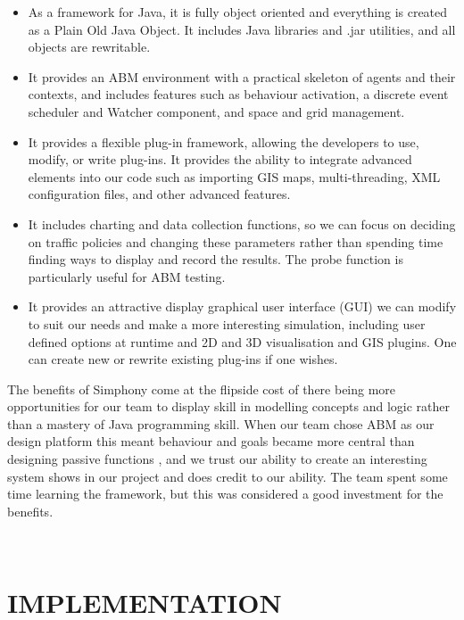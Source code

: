\documentclass[11pt]{article}
\begin{document}
\begin{itemize}\itemsep0pt
\item As a framework for Java, it is fully object oriented and everything is created as a Plain Old Java Object. It includes Java libraries and .jar utilities, and all objects are rewritable.
\\
\item It provides an ABM environment with a practical skeleton of agents and their contexts, and includes features such as behaviour activation, a discrete event scheduler and Watcher component, and space and grid management.
\\
\item It provides a flexible plug-in framework, allowing the developers to use, modify, or write plug-ins. It provides the ability to integrate advanced elements into our code such as importing GIS maps, multi-threading, XML configuration files, and other advanced features.
\\
\item It includes charting and data collection functions, so we can focus on deciding on traffic policies and changing these parameters rather than spending time finding ways to display and record the results. The probe function is particularly useful for ABM testing.
\\
\item It provides an attractive display graphical user interface (GUI) we can modify to suit our needs and make a more interesting simulation, including user defined options at runtime and 2D and 3D visualisation and GIS plugins. One can create new or rewrite existing plug-ins if one wishes.
\end {itemize}

The benefits of Simphony come at the flipside cost of there being more opportunities for our team to display skill in modelling concepts and logic rather than a mastery of Java programming skill. When our team chose ABM as our design platform this meant behaviour and goals became more central than designing passive functions \cite{4d}, and we trust our ability to create an interesting system shows in our project and does credit to our ability. The team spent some time learning the framework, but this was considered a good investment for the benefits.

\\ 

\section{IMPLEMENTATION}
\end{document}
